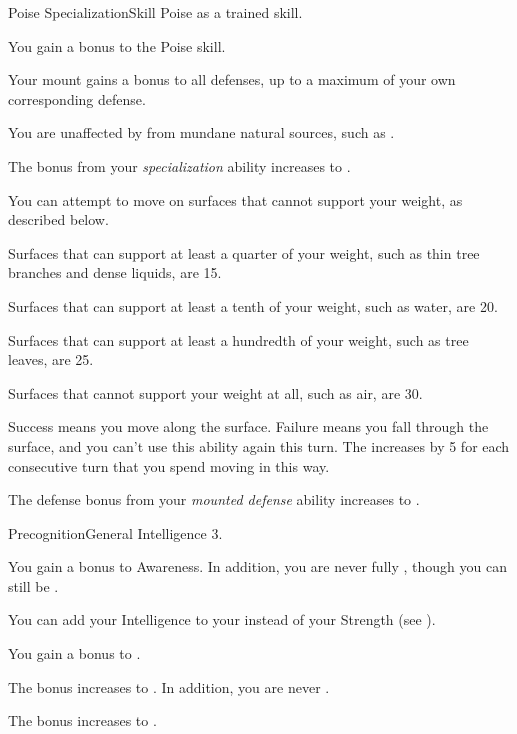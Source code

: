   \begin{feat}{Poise Specialization}{Skill}
    \featpre Poise as a trained skill.

     You gain a  bonus to the Poise skill.

     Your mount gains a  bonus to all defenses, up to a maximum of your own corresponding defense.

     You are unaffected by  from mundane natural sources, such as .

     The bonus from your \textit{specialization} ability increases to .

     You can attempt to move on surfaces that cannot support your weight, as described below.
    \begin{raggeditemize}
      \item Surfaces that can support at least a quarter of your weight, such as thin tree branches and dense liquids, are  15.
      \item Surfaces that can support at least a tenth of your weight, such as water, are  20.
      \item Surfaces that can support at least a hundredth of your weight, such as tree leaves, are  25.
      \item Surfaces that cannot support your weight at all, such as air, are  30.
    \end{raggeditemize}

    Success means you move along the surface.
    Failure means you fall through the surface, and you can't use this ability again this turn.
    The  increases by 5 for each consecutive turn that you spend moving in this way.

     The defense bonus from your \textit{mounted defense} ability increases to .
  \end{feat}

  \begin{feat}{Precognition}{General}
    \featpre Intelligence 3.

     You gain a  bonus to Awareness.
    In addition, you are never fully \unaware, though you can still be \partiallyunaware.

     You can add your Intelligence to your  instead of your Strength (see ).

     You gain a  bonus to .

     The bonus increases to .
    In addition, you are never \partiallyunaware.

     The bonus increases to .
  \end{feat}

